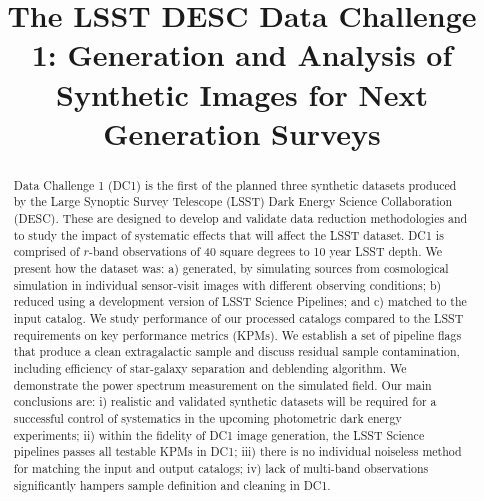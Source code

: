 \documentclass[twocolumn]{aastex62}
\newcommand{\as}[1]{{\textcolor{magenta}{{\textbf (AS: #1)}}}}
\begin{document}
\title[LSST DESC DC1]{The LSST DESC Data Challenge 1: Generation and Analysis of Synthetic Images for Next Generation Surveys }


\begin{abstract}
  Data Challenge 1 (DC1) is the first of the planned three synthetic
  datasets produced by the Large Synoptic Survey Telescope (LSST)
  Dark Energy Science Collaboration (DESC). These are designed to
  develop and validate data reduction methodologies
  and to study the impact of systematic effects that
  will affect the LSST dataset. DC1 is comprised of $r$-band
  observations of 40 square degrees to 10 year LSST depth. We present
  how the dataset was: a) generated, by simulating sources from cosmological
  simulation in individual sensor-visit images with different observing conditions; b)
  reduced using a development version of
  LSST Science Pipelines; and c) matched to the input catalog. We
  study performance of our processed catalogs compared to the
  LSST requirements on key performance metrics (KPMs). We establish a
  set of pipeline flags that produce a clean extragalactic sample and
  discuss residual sample contamination, including efficiency of
  star-galaxy separation and deblending algorithm. We demonstrate the
  power spectrum measurement on the simulated field. Our main
  conclusions are: i) realistic and validated synthetic datasets will
  be required for a successful control of systematics in the upcoming
  photometric dark energy experiments; ii) within the fidelity of DC1
  image generation, the LSST Science pipelines passes all testable KPMs in DC1;
   iii) there is no individual noiseless method for matching the input and output
  catalogs; iv) lack of multi-band observations significantly hampers
  sample definition and cleaning in DC1.

  


\end{abstract}
\end{document}
